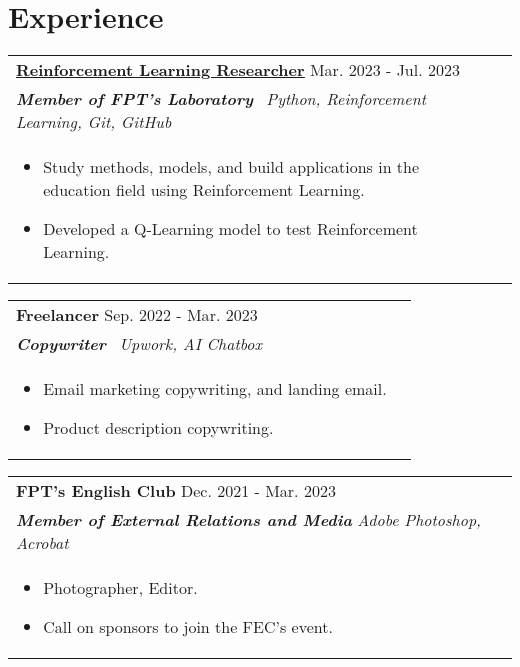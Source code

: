\documentclass[a4paper,8pt]{article}
\begin{document}
\section{Experience}
\begin{tabularx}{\linewidth}{ @{}l r@{} }
\textbf{\uline{\href{https://github.com/tuephan171611}{Reinforcement Learning Researcher}}} \hfill \color[HTML]{371e77} Mar. 2023 - Jul. 2023 \\[4pt]
\color[HTML]{371e77}\textbf{\textit{Member of FPT's Laboratory}}\ \hfill \color[HTML]{4B28A4} \textit{Python, Reinforcement Learning, Git, GitHub} \\[5pt]
\begin{minipage}[t]{\linewidth}
    \begin{itemize}[nosep,after=\strut, leftmargin=2em, itemsep=2pt]
        \item Study methods, models, and build applications in the education field using Reinforcement Learning.
        \item Developed a Q-Learning model to test Reinforcement Learning.
    \end{itemize}
\end{minipage}
\end{tabularx}

\begin{tabularx}{\linewidth}{ @{}l r@{} }
\color[HTML]{1C033C} \textbf{Freelancer} \hfill \color[HTML]{371e77} Sep. 2022 - Mar. 2023 \\[4pt]
\color[HTML]{371e77}\textbf{\textit{Copywriter}}\ \hfill \color[HTML]{4B28A4} \textit{Upwork, AI Chatbox} \\[5pt]
\begin{minipage}[t]{\linewidth}
    \begin{itemize}[nosep,after=\strut, leftmargin=2em, itemsep=2pt]
        \item Email marketing copywriting, and landing email.
        \item Product description copywriting.
    \end{itemize}
\end{minipage}
\end{tabularx}

\begin{tabularx}{\linewidth}{ @{}l r@{} }
\color[HTML]{1C033C} \textbf{FPT's English Club} \hfill \color[HTML]{371e77} Dec. 2021 - Mar. 2023 \\[4pt]
\color[HTML]{371e77}\textbf{\textit{Member of External Relations and Media}} \hfill \color[HTML]{4B28A4} \textit{Adobe Photoshop, Acrobat} \\[5pt]
\begin{minipage}[t]{\linewidth}
    \begin{itemize}[nosep,after=\strut, leftmargin=2em, itemsep=2pt]
        \item Photographer, Editor. 
        \item Call on sponsors to join the FEC's event.
    \end{itemize}
    \end{minipage}
\end{tabularx}
\end{document}
